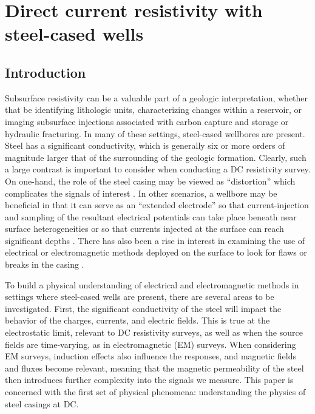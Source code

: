 
\chapter{Direct current resistivity with steel-cased wells}
\label{ch:casing_dc}


\section{Introduction}
Subsurface resistivity can be a valuable part of a geologic interpretation, whether that be identifying lithologic units, characterizing changes within a reservoir, or imaging subsurface injections associated with carbon capture and storage or hydraulic fracturing. In many of these settings, steel-cased wellbores are present. Steel has a significant conductivity, which is generally six or more orders of magnitude larger that of the surrounding of the geologic formation. Clearly, such a large contrast is important to consider when conducting a DC resistivity survey. On one-hand, the role of the steel casing may be viewed as ``distortion'' which complicates the signals of interest \citep{Wait1983, Holladay1984, Johnston1987}. In other scenarios, a wellbore may be beneficial in that it can serve as an ``extended electrode'' so that current-injection and sampling of the resultant electrical potentials can take place beneath near surface heterogeneities \citep{Ramirez1996, Rucker2010, Rucker2012} or so that currents injected at the surface can reach significant depths \citep{Schenkel1994, Weiss2016, hoversten2017borehole}. There has also been a rise in interest in examining the use of electrical or electromagnetic methods deployed on the surface to look for flaws or breaks in the casing \citep{Wilt2018}.

To build a physical understanding of electrical and electromagnetic methods in settings where steel-cased wells are present, there are several areas to be investigated. First, the significant conductivity of the steel will impact the behavior of the charges, currents, and electric fields. This is true at the electrostatic limit, relevant to DC resistivity surveys, as well as when the source fields are time-varying, as in electromagnetic (EM) surveys. When considering EM surveys, induction effects also influence the responses, and magnetic fields and fluxes become relevant, meaning that the magnetic permeability of the steel then introduces further complexity into the signals we measure. This paper is concerned with the first set of physical phenomena: understanding the physics of steel casings at DC.


